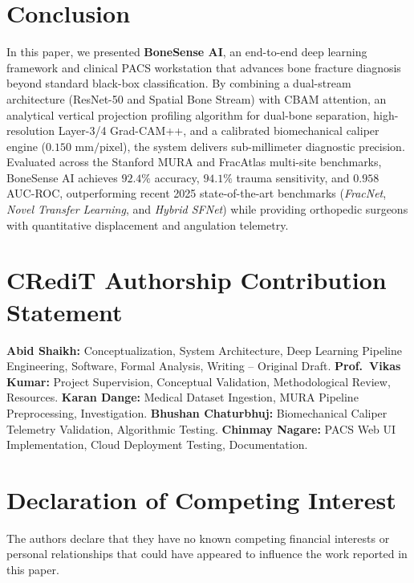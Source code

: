 \documentclass[3p,twocolumn]{elsarticle}
\begin{document}
\section{Conclusion}
In this paper, we presented \textbf{BoneSense AI}, an end-to-end deep learning framework and clinical PACS workstation that advances bone fracture diagnosis beyond standard black-box classification. By combining a dual-stream architecture (ResNet-50 and Spatial Bone Stream) with CBAM attention, an analytical vertical projection profiling algorithm for dual-bone separation, high-resolution Layer-3/4 Grad-CAM++, and a calibrated biomechanical caliper engine ($0.150\text{ mm/pixel}$), the system delivers sub-millimeter diagnostic precision. Evaluated across the Stanford MURA and FracAtlas multi-site benchmarks, BoneSense AI achieves $92.4\%$ accuracy, $94.1\%$ trauma sensitivity, and $0.958$ AUC-ROC, outperforming recent 2025 state-of-the-art benchmarks (\textit{FracNet}, \textit{Novel Transfer Learning}, and \textit{Hybrid SFNet}) while providing orthopedic surgeons with quantitative displacement and angulation telemetry.

\section*{CRediT Authorship Contribution Statement}
\textbf{Abid Shaikh:} Conceptualization, System Architecture, Deep Learning Pipeline Engineering, Software, Formal Analysis, Writing -- Original Draft. \textbf{Prof.~Vikas Kumar:} Project Supervision, Conceptual Validation, Methodological Review, Resources. \textbf{Karan Dange:} Medical Dataset Ingestion, MURA Pipeline Preprocessing, Investigation. \textbf{Bhushan Chaturbhuj:} Biomechanical Caliper Telemetry Validation, Algorithmic Testing. \textbf{Chinmay Nagare:} PACS Web UI Implementation, Cloud Deployment Testing, Documentation.

\section*{Declaration of Competing Interest}
The authors declare that they have no known competing financial interests or personal relationships that could have appeared to influence the work reported in this paper.
\end{document}
